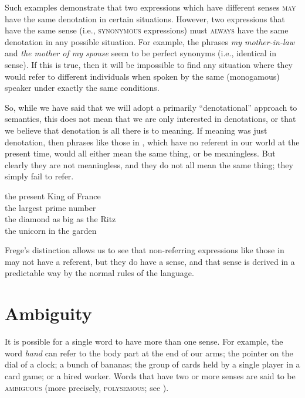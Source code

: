 Such examples demonstrate that two expressions which have different senses \textsc{may} have the same denotation in certain situations. However, two expressions that have the same sense (i.e., \textsc{synonymous} expressions) must \textsc{always} have the same denotation in any possible situation. For example, the phrases \textit{my mother-in-law} and \textit{the mother of my spouse} seem to be perfect synonyms (i.e., identical in sense). If this is true, then it will be impossible to find any situation where they would refer to different individuals when spoken by the same (monogamous) speaker under exactly the same conditions.



So, while we have said that we will adopt a primarily “denotational” approach to semantics, this does not mean that we are only interested in denotations, or that we believe that denotation is all there is to meaning. If meaning was just denotation, then phrases like those in , which have no referent in our world at the present time, would all either mean the same thing, or be meaningless. But clearly they are not meaningless, and they do not all mean the same thing; they simply fail to refer. 


\ea \label{ex:2.12}
\ea the present King of France\\
\ex the largest prime number\\
\ex the diamond as big as the Ritz\\
\ex the unicorn in the garden
                       \z
\z


Frege’s distinction allows us to see that non-referring expressions like those in  may not have a referent, but they do have a sense, and that sense is derived in a predictable way by the normal rules of the language.


\section{Ambiguity}\label{sec:2.5}

It is possible for a single word to have more than one sense. For example, the word \textit{hand} can refer to the body part at the end of our arms; the pointer on the dial of a clock; a bunch of bananas; the group of cards held by a single player in a card game; or a hired worker. Words that have two or more senses are said to be \textsc{ambiguous} (more precisely, \textsc{polysemous}; see ).



